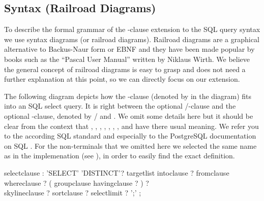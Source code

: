 \subsection{Syntax (Railroad Diagrams)}
To describe the formal grammar of the -clause
extension to the SQL query syntax we use syntax diagrams (or railroad
diagrams). Railroad diagrams are a graphical alternative to
Backus-Naur form or EBNF and they have been made popular by books such
as the ``Pascal User Manual'' written by Niklaus Wirth. We believe the
general concept of railroad diagrams is easy to grasp and does not
need a further explanation at this point, so we can directly focus on
our  extension.


\railnontermfont{\rmfamily\itshape}
\railtermfont{\ttfamily\upshape\small}
\railboxheight 12pt
\railinit

The following diagram depicts how the -clause
(denoted by  in the diagram) fits into an SQL
select query.  It is right between the optional /-clause and the optional -clause, denoted by  /  and
. We omit some details here but it should be clear
from the context that , ,
, , ,
, , and  have
there usual meaning. We refer you to the according SQL standard and
especially to the PostgreSQL documentation on SQL
. For the non-terminals that we omitted
here we selected the same name as in the implemenation (see
), in order to easily find the exact definition.

%
\begin{rail}
selectclause :
    'SELECT' 'DISTINCT'? targetlist intoclause ? fromclause \\ 
    whereclause ? ( groupclause havingclause ? ) ? \\
    skylineclause ? sortclause ? selectlimit ? ';' ;
\end{rail}




